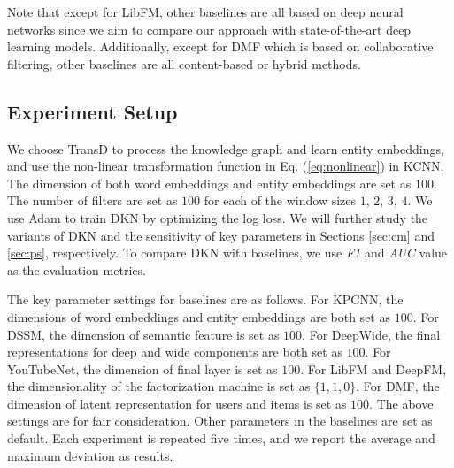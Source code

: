 \documentclass[sigconf]{acmart}
\begin{document}
		Note that except for LibFM, other baselines are all based on deep neural networks since we aim to compare our approach with state-of-the-art deep learning models.
		Additionally, except for DMF which is based on collaborative filtering, other baselines are all content-based or hybrid methods.
		
	
	\subsection{Experiment Setup}
	\label{sec:es}
		We choose TransD \cite{ji2015knowledge} to process the knowledge graph and learn entity embeddings, and use the non-linear transformation function in Eq. (\ref{eq:nonlinear}) in KCNN.
		The dimension of both word embeddings and entity embeddings are set as $100$.
		The number of filters are set as $100$ for each of the window sizes $1$, $2$, $3$, $4$.		
		We use Adam \cite{kingma2014adam} to train DKN by optimizing the log loss.
		We will further study the variants of DKN and the sensitivity of key parameters in Sections \ref{sec:cm} and \ref{sec:ps}, respectively.
		To compare DKN with baselines, we use \textit{F1} and \textit{AUC} value as the evaluation metrics.
		
		The key parameter settings for baselines are as follows.
		For KPCNN, the dimensions of word embeddings and entity embeddings are both set as $100$.
		For DSSM, the dimension of semantic feature is set as $100$.
		For DeepWide, the final representations for deep and wide components are both set as $100$.
		For YouTubeNet, the dimension of final layer is set as $100$.
		For LibFM and DeepFM, the dimensionality of the factorization machine is set as $\{1, 1, 0 \}$.
		For DMF, the dimension of latent representation for users and items is set as $100$.
		The above settings are for fair consideration.
		Other parameters in the baselines are set as default.
		Each experiment is repeated five times, and we report the average and maximum deviation as results.
	
\end{document}
